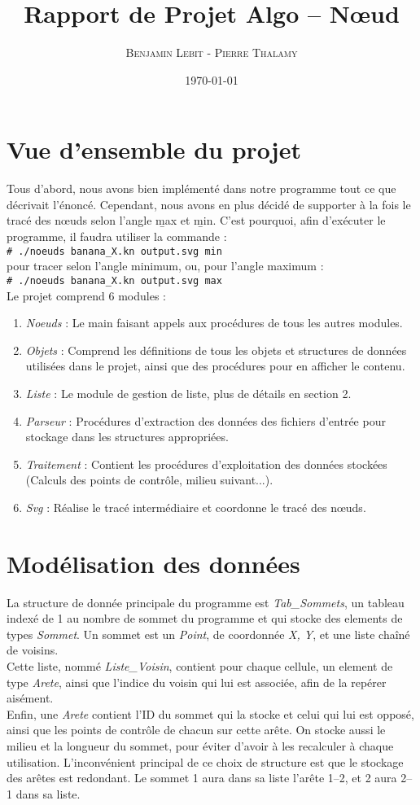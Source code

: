 \documentclass[12pt]{article}
\title{Rapport de Projet Algo -- Nœud}
\author{\textsc{Benjamin Lebit} - \textsc{Pierre Thalamy}}
\date{\today}
\newcommand{\shellcmd}[1]{\\\indent\indent\texttt{\footnotesize\# #1}\\}
\begin{document}
\maketitle

\section {Vue d'ensemble du projet}
Tous d'abord, nous avons bien implémenté dans notre programme tout ce
que décrivait l'énoncé. Cependant, nous avons en plus décidé de supporter à la
fois le tracé des nœuds selon l'angle \b{max} et \b{min}. C'est pourquoi, afin
d'exécuter le programme, il faudra utiliser la commande :
\shellcmd{./noeuds banana\_X.kn output.svg min} 
pour tracer selon l'angle minimum, ou, pour l'angle maximum :
\shellcmd{./noeuds banana\_X.kn output.svg max} 

Le projet comprend 6 modules :
\begin{enumerate}
\item \emph{Noeuds} : Le main faisant appels aux procédures de tous
  les autres modules.
\item \emph{Objets} : Comprend les définitions de tous les objets et
  structures de données utilisées dans le projet, ainsi que des
  procédures pour en afficher le contenu.
\item \emph{Liste} : Le module de gestion de liste, plus de détails en
  section 2.
\item \emph{Parseur} : Procédures d'extraction des données des fichiers
  d'entrée pour stockage dans les structures appropriées.
\item \emph{Traitement} : Contient les procédures d'exploitation des
  données stockées (Calculs des points de contrôle, milieu
  suivant...).
\item \emph{Svg} : Réalise le tracé intermédiaire et coordonne le tracé des nœuds.
\end{enumerate}

\section {Modélisation des données}
La structure de donnée principale du programme est \emph{Tab\_Sommets},
un tableau indexé de 1 au nombre de sommet du programme et qui stocke
des elements de types \emph{Sommet}. Un sommet est un \emph{Point}, de
coordonnée \emph{X, Y}, et une liste chaîné de voisins. \\
Cette liste, nommé \emph{Liste\_Voisin}, contient pour chaque cellule,
un element de type \emph{Arete}, ainsi que l'indice du voisin qui lui
est associée, afin de la repérer aisément. \\
Enfin, une \emph{Arete} contient l'ID du sommet qui la stocke et celui
qui lui est opposé, ainsi que les points de contrôle de chacun sur
cette arête. On stocke aussi le milieu et la longueur du sommet, pour
éviter d'avoir à les recalculer à chaque utilisation. L'inconvénient
principal de ce choix de structure est que le stockage des arêtes est
redondant. Le sommet 1 aura dans sa liste l'arête 1--2, et 2 aura
2--1 dans sa liste.
\end{document}
